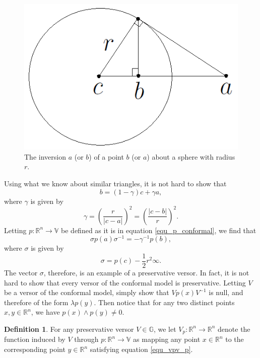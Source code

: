 \documentclass{birkjour}
\theoremstyle{definition}
\newtheorem{defn}[thm]{Definition}
\theoremstyle{remark}
\numberwithin{equation}{section}
\newcommand{\R}{\mathbb{R}}
\newcommand{\G}{\mathbb{G}}
\newcommand{\V}{\mathbb{V}}
\newcommand{\nvai}{\infty}
\begin{document}
\begin{figure}
\centering
\includegraphics[scale=0.3]{SphericalInversion}
\caption{The inversion $a$ (or $b$) of a point $b$ (or $a$) about a sphere with radius $r$.}\label{fig_spherical_inversion}
\end{figure}

Using what we know about similar triangles, it is not hard to show that
\begin{equation*}
b=(1-\gamma)c+\gamma a,
\end{equation*}
where $\gamma$ is given by
\begin{equation*}
\gamma = \left(\frac{r}{|c-a|}\right)^2=\left(\frac{|c-b|}{r}\right)^2.
\end{equation*}
Letting $p:\R^n\to\V$ be defined as it is in equation \eqref{equ_p_conformal}, we find that
\begin{equation*}
\sigma p(a)\sigma^{-1}=-\gamma^{-1}p(b),
\end{equation*}
where $\sigma$ is given by
\begin{equation*}
\sigma = p(c)-\frac{1}{2}r^2\nvai.
\end{equation*}
The vector $\sigma$, therefore, is an example of a preservative versor.  In fact, it is
not hard to show that every versor of the conformal model is preservative.
Letting $V$ be a versor of the conformal model, simply show that $Vp(x)V^{-1}$ is null,
and therefore of the form $\lambda p(y)$.  Then notice that for any two distinct points $x,y\in\R^n$,
we have $p(x)\wedge p(y)\neq 0$.

\begin{defn}\label{def_preservative_versor_induced_func}
For any preservative versor $V\in\G$, we let $V_p:\R^n\to\R^n$ denote
the function induced by $V$ through $p:\R^n\to\V$ as mapping any point $x\in\R^n$
to the corresponding point $y\in\R^n$ satisfying equation \eqref{equ_vpv_p}.
\end{defn}
\end{document}
